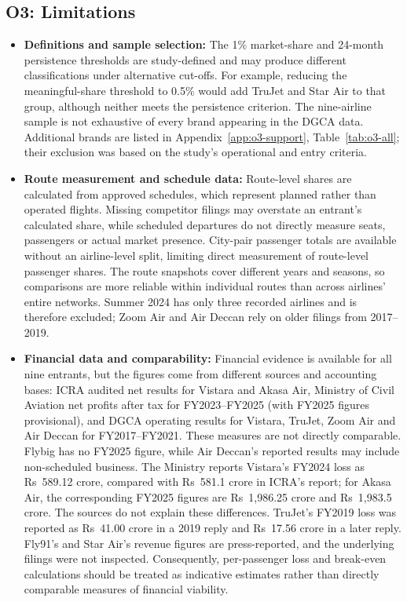 \documentclass[12pt,a4paper]{article}
\newenvironment{authorcontribution}[1]{\par\begingroup\colorlet{currentAuthor}{#1}\color{#1}\captionsetup{font+={color=#1}}}{\par\endgroup}
\begin{document}
\begin{authorcontribution}{authorSweta}
\subsection{O3: Limitations}

\begin{itemize}
    \item \textbf{Definitions and sample selection:} The 1\% market-share and 24-month persistence thresholds are study-defined and may produce different classifications under alternative cut-offs. For example, reducing the meaningful-share threshold to 0.5\% would add TruJet and Star Air to that group, although neither meets the persistence criterion. The nine-airline sample is not exhaustive of every brand appearing in the DGCA data. Additional brands are listed in Appendix~\ref{app:o3-support}, Table~\ref{tab:o3-all}; their exclusion was based on the study's operational and entry criteria.

    \item \textbf{Route measurement and schedule data:} Route-level shares are calculated from approved schedules, which represent planned rather than operated flights. Missing competitor filings may overstate an entrant's calculated share, while scheduled departures do not directly measure seats, passengers or actual market presence. City-pair passenger totals are available without an airline-level split, limiting direct measurement of route-level passenger shares. The route snapshots cover different years and seasons, so comparisons are more reliable within individual routes than across airlines' entire networks. Summer 2024 has only three recorded airlines and is therefore excluded; Zoom Air and Air Deccan rely on older filings from 2017--2019.

    \item \textbf{Financial data and comparability:} Financial evidence is available for all nine entrants, but the figures come from different sources and accounting bases: ICRA audited net results for Vistara and Akasa Air, Ministry of Civil Aviation net profits after tax for FY2023--FY2025 (with FY2025 figures provisional), and DGCA operating results for Vistara, TruJet, Zoom Air and Air Deccan for FY2017--FY2021. These measures are not directly comparable. Flybig has no FY2025 figure, while Air Deccan's reported results may include non-scheduled business. The Ministry reports Vistara's FY2024 loss as Rs~589.12 crore, compared with Rs~581.1 crore in ICRA's report; for Akasa Air, the corresponding FY2025 figures are Rs~1,986.25 crore and Rs~1,983.5 crore. The sources do not explain these differences. TruJet's FY2019 loss was reported as Rs~41.00 crore in a 2019 reply and Rs~17.56 crore in a later reply. Fly91's and Star Air's revenue figures are press-reported, and the underlying filings were not inspected. Consequently, per-passenger loss and break-even calculations should be treated as indicative estimates rather than directly comparable measures of financial viability.


\end{itemize}
\end{authorcontribution}
\end{document}
